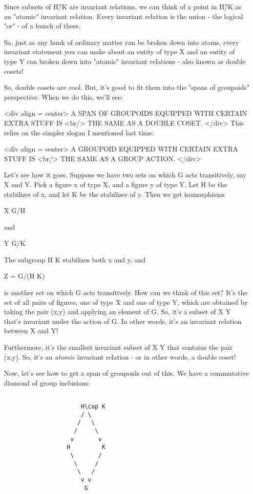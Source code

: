 Since subsets of H\G/K are invariant relations, we can think of a 
point in H\G/K as an "atomic" invariant relation.   Every invariant 
relation is the union - the logical "or" - of a bunch of these. 

So, just as any hunk of ordinary matter can be broken down into atoms,
every invariant statement you can make about an entity of type X and
an entity of type Y can broken down into "atomic" invariant
relations - also known as double cosets!

So, double cosets are cool.  But, it's good to fit them into the "spans
of groupoids" perspective.  When we do this, we'll see:

<div align = center>
          A SPAN OF GROUPOIDS EQUIPPED WITH CERTAIN EXTRA STUFF IS <br/>
                       THE SAME AS A DOUBLE COSET.
</div>
This relies on the simpler slogan I mentioned last time:

<div align = center>
             A GROUPOID EQUIPPED WITH CERTAIN EXTRA STUFF IS <br/>
                     THE SAME AS A GROUP ACTION.
</div>

Let's see how it goes.  Suppose we have two sets on which G acts
transitively, say X and Y.  Pick a figure x of type X, and a figure
y of type Y.  Let H be the stabilizer of x, and let K be the
stabilizer of y.  Then we get isomorphisms

X \cong  G/H 

and 

Y \cong  G/K

The subgroup H \cap  K stabilizes both x and y, and

Z = G/(H \cap  K)

is another set on which G acts transitively.  How can we think of this 
set?  It's the set of all pairs of figures, one of type X and one of 
type Y, which are obtained by taking the pair (x,y) and applying
an element of G.  So, it's a subset of X \times  Y that's invariant under
the action of G.  In other words, it's an invariant relation between
X and Y!  

Furthermore, it's the smallest invariant subset of X \times  Y that contains
the pair (x,y).  So, it's an \emph{atomic} invariant relation - or in other
words, a double coset!  
  
Now, let's see how to get a span of groupoids out of this.  We have
a commutative diamond of group inclusions:


\begin{verbatim}

                      H\cap K
                      / \
                     /   \
                    /     \
                   v       v
                  H         K
                   \       /
                    \     /
                     \   /
                      v v
                       G
\end{verbatim}
    

